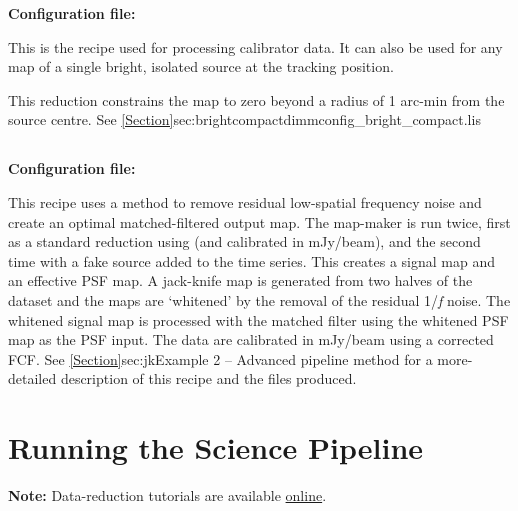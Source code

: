 \textbf{Configuration file: }

This is the recipe used for processing calibrator data. It can also
be used for any map of a single bright, isolated source at the
tracking position. 

This reduction constrains the map to zero beyond a radius of 1 arc-min
from the source centre. See \cref{Section}{sec:brightcompact}{dimmconfig\_bright\_compact.lis}


\subsection{}

\textbf{Configuration file: }

This recipe uses a
method to remove residual low-spatial frequency noise and create an
optimal matched-filtered output map. The map-maker is run twice, first
as a standard reduction using  (and
calibrated in mJy/beam), and the second time with a fake source added
to the time series. This creates a signal map and an effective PSF
map. A jack-knife map is generated from two halves of the dataset and
the maps are `whitened' by the removal of the residual 1/\emph{f}
noise. The whitened signal map is processed with the matched filter
using the whitened PSF map as the PSF input. The data are calibrated
in mJy/beam using a corrected FCF.  See \cref{Section}{sec:jk}{Example
  2 -- Advanced pipeline method} for a more-detailed description of
this recipe and the files produced.


\section{Running the Science Pipeline}
\label{sec:plsteps}

\textbf{Note:} Data-reduction tutorials are available
\href{https://www.eaobservatory.org/jcmt/science/reductionanalysis-tutorials/}{online}.

